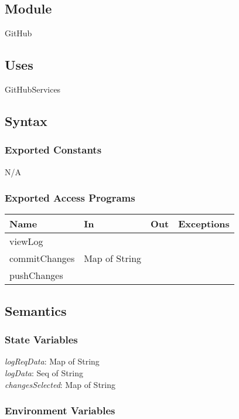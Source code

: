 \documentclass[12pt, titlepage]{article}
\begin{document}
	\subsection{Module}
	GitHub
	
	\subsection{Uses}
	GitHubServices
	
	\subsection{Syntax}
	
	\subsubsection{Exported Constants}
	N/A
	
	\subsubsection{Exported Access Programs}
	
	\begin{center}
		\begin{tabular}{l  l  l  l}
			\hline
			\textbf{Name} & \textbf{In} & \textbf{Out} & \textbf{Exceptions} \\
			\hline
			viewLog & ~ & ~ & ~ \\
			\hline
			commitChanges & Map of String & ~ & ~ \\
			\hline
			pushChanges & ~ & ~ & ~ \\
			\hline
			
		\end{tabular}
	\end{center}
	
	
	\subsection{Semantics}
	
	\subsubsection{State Variables}
	\textit{logReqData}: Map of String \\
	\textit{logData}: Seq of String \\
	\textit{changesSelected}: Map of String \\
	
	
	\subsubsection{Environment Variables}
	
\end{document}
